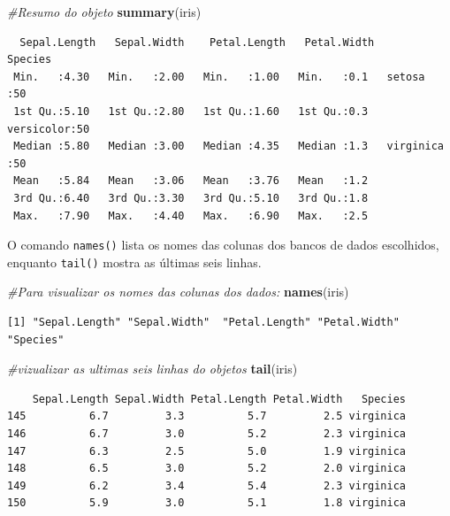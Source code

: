 \documentclass[12pt,brazil,oneside]{book}
\newenvironment{Shaded}{\begin{snugshade}}{\end{snugshade}}
\newcommand{\CommentTok}[1]{\textcolor[rgb]{0.56,0.35,0.01}{\textit{#1}}}
\newcommand{\KeywordTok}[1]{\textcolor[rgb]{0.13,0.29,0.53}{\textbf{#1}}}
\newcommand{\NormalTok}[1]{#1}
\begin{document}
\begin{Shaded}
\begin{Highlighting}[]
\CommentTok{#Resumo do objeto}
\KeywordTok{summary}\NormalTok{(iris)}
\end{Highlighting}
\end{Shaded}

\begin{verbatim}
  Sepal.Length   Sepal.Width    Petal.Length   Petal.Width        Species  
 Min.   :4.30   Min.   :2.00   Min.   :1.00   Min.   :0.1   setosa    :50  
 1st Qu.:5.10   1st Qu.:2.80   1st Qu.:1.60   1st Qu.:0.3   versicolor:50  
 Median :5.80   Median :3.00   Median :4.35   Median :1.3   virginica :50  
 Mean   :5.84   Mean   :3.06   Mean   :3.76   Mean   :1.2                  
 3rd Qu.:6.40   3rd Qu.:3.30   3rd Qu.:5.10   3rd Qu.:1.8                  
 Max.   :7.90   Max.   :4.40   Max.   :6.90   Max.   :2.5                  
\end{verbatim}

O comando \texttt{names()} lista os nomes das colunas dos bancos de dados escolhidos, enquanto \texttt{tail()} mostra as últimas seis linhas.

\begin{Shaded}
\begin{Highlighting}[]
\CommentTok{#Para visualizar os nomes das colunas dos dados:}
\KeywordTok{names}\NormalTok{(iris)}
\end{Highlighting}
\end{Shaded}

\begin{verbatim}
[1] "Sepal.Length" "Sepal.Width"  "Petal.Length" "Petal.Width"  "Species"     
\end{verbatim}

\begin{Shaded}
\begin{Highlighting}[]
\CommentTok{#vizualizar as ultimas seis linhas do objetos}
\KeywordTok{tail}\NormalTok{(iris)}
\end{Highlighting}
\end{Shaded}

\begin{verbatim}
    Sepal.Length Sepal.Width Petal.Length Petal.Width   Species
145          6.7         3.3          5.7         2.5 virginica
146          6.7         3.0          5.2         2.3 virginica
147          6.3         2.5          5.0         1.9 virginica
148          6.5         3.0          5.2         2.0 virginica
149          6.2         3.4          5.4         2.3 virginica
150          5.9         3.0          5.1         1.8 virginica
\end{verbatim}
\end{document}
